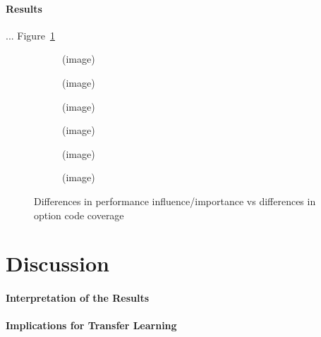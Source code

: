 \paragraph*{Results}{\color{red} ... Figure~\ref{fig:diff_performance_option_coverage}}\\

\begin{figure}
	\centering
	\begin{subfigure}{0.33\textwidth}
		\centering
		(image)
		\caption{\batik}
	\end{subfigure}
	\begin{subfigure}{0.33\textwidth}
		\centering
		(image)
		\caption{\dconvert}
	\end{subfigure}
	\begin{subfigure}{0.33\textwidth}
		\centering
		(image)
		\caption{\htwo}
	\end{subfigure}
	\begin{subfigure}{0.33\textwidth}
		\centering
		(image)
		\caption{\jumper}
	\end{subfigure}
	\begin{subfigure}{0.33\textwidth}
		\centering
		(image)
		\caption{\jadx}
	\end{subfigure}
	\begin{subfigure}{0.33\textwidth}
		\centering
		(image)
		\caption{\kanzi}
	\end{subfigure}
	\caption{Differences in performance influence/importance vs differences in option code coverage}
	\label{fig:diff_performance_option_coverage}
\end{figure}


\section{Discussion}
\paragraph*{Interpretation of the Results}
\paragraph*{Implications for Transfer Learning}
